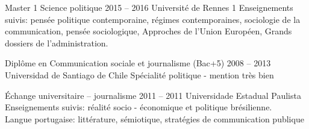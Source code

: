 \documentclass[30pt, french]{tccv}
\begin{document}
\begin{upshape}
\begin{textblock}{21}
\begin{center}
\end{center}
\end{textblock}  





%
%




\begin{education}

\vspace{0.5cm}
\item[Master 1 Science politique]{2015 -- 2016}
     {Université de Rennes 1}
     {Enseignements suivis: pensée politique contemporaine, 
     régimes contemporaines, sociologie de la communication, pensée sociologique, 
     Appro\-ches de l'Union Européen, Grands dossiers de\- l'ad\-mi\-ni\-stra\-tion.}



\vspace{0.5cm}
\item[Diplôme en Communication sociale et journalisme (Bac+5)]{2008 -- 2013}
     {Universidad de Santiago de Chile}
     {Spécialité politique
     - mention très bien
     }

 \vspace{0.5cm}    
\item[Échange universitaire -- journalisme]{2011 -- 2011}
     {Universidade Estadual Pau\-li\-sta}
     {Enseignements suivis: réalité socio - é\-co\-no\-mi\-que et politique brésilienne. \\
     Langue portugaise: littérature, sémiotique, stra\-té\-gies de communication publique}


\end{education}


%
%


\begin{competence}


\end{competence}
\end{upshape}
\end{document}
